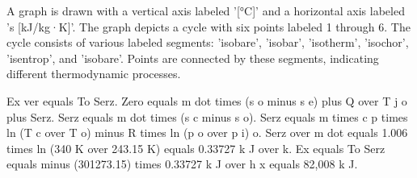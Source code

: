 A graph is drawn with a vertical axis labeled '[°C]' and a horizontal axis labeled 's [kJ/kg·K]'. The graph depicts a cycle with six points labeled 1 through 6. The cycle consists of various labeled segments: 'isobare', 'isobar', 'isotherm', 'isochor', 'isentrop', and 'isobare'. Points are connected by these segments, indicating different thermodynamic processes.

Ex ver equals To Serz.  
Zero equals m dot times (s o minus s e) plus Q over T j o plus Serz.  
Serz equals m dot times (s c minus s o).  
Serz equals m times c p times ln (T c over T o) minus R times ln (p o over p i) o.  
Serz over m dot equals 1.006 times ln (340 K over 243.15 K) equals 0.33727 k J over k.  
Ex equals To Serz equals minus (301273.15) times 0.33727 k J over h x equals 82,008 k J.